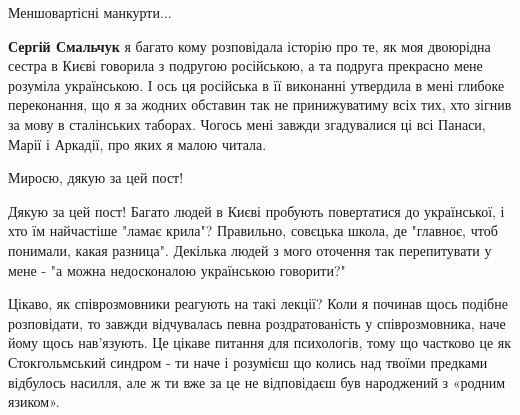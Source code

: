 \begin{itemize}
Меншовартісні манкурти...

\begin{itemize}
 
\textbf{Сергій Смальчук} я багато кому розповідала історію про те, як моя
двоюрідна сестра в Києві говорила з подругою російською, а та подруга прекрасно
мене розуміла українською. І ось ця російська в її виконанні утвердила в мені
глибоке переконання, що я за жодних обставин так не принижуватиму всіх тих, хто
зігнив за мову в сталінських таборах. Чогось мені завжди згадувалися ці всі
Панаси, Марії і Аркадії, про яких я малою читала.
\end{itemize}

 
Миросю, дякую за цей пост! 💙💛

 

Дякую за цей пост! Багато людей в Києві пробують повертатися до української, і
хто їм найчастіше "ламає крила"? Правильно, совєцька школа, де "главноє, чтоб
понимали, какая разница". Декілька людей з мого оточення так перепитувати у
мене - "а можна недосконалою українською говорити?"


 

Цікаво, як співрозмовники реагують на такі лекції? Коли я починав щось подібне
розповідати, то завжди відчувалась певна роздратованість у співрозмовника, наче
йому щось нав’язують. Це цікаве питання для психологів, тому що частково це як
Стокгольмський синдром - ти наче і розумієш що колись над твоїми предками
відбулось насилля, але ж ти вже за це не відповідаєш був народжений з «родним
язиком».


\end{itemize}
